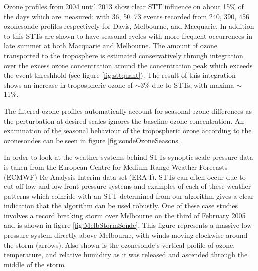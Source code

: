 Ozone profiles from 2004 until 2013 show clear STT influence on about 15\% of the days which are measured: with 36, 50, 73 events recorded from 240, 390, 456 ozonesonde profiles respectively for Davis, Melbourne, and Macquarie.
In addition to this STTs are shown to have seasonal cycles with more frequent occurrences in late summer at both Macquarie and Melbourne.
The amount of ozone transported to the troposphere is estimated conservatively through integration over the excess ozone concentration around the concentration peak which exceeds the event threshhold (see figure \ref{fig:sttquant}).
The result of this integration shows an increase in tropospheric ozone of $\sim$3\% due to STTs, with maxima $\sim$11\%.
 
The filtered ozone profiles automatically account for seasonal ozone differences as the perturbation at desired scales ignores the baseline ozone concentration.
An examination of the seasonal behaviour of the tropospheric ozone according to the ozonesondes can be seen in figure \ref{fig:sondeOzoneSeasons}.

In order to look at the weather systems behind STTs synoptic scale pressure data is taken from the European Centre for Medium-Range Weather Forecasts (ECMWF) Re-Analysis Interim data set (ERA-I).
STTs can often occur due to cut-off low and low front pressure systems and examples of each of these weather patterns which coincide with an STT determined from our algorithm gives a clear indication that the algorithm can be used robustly.
One of these case studies involves a record breaking storm over Melbourne on the third of February 2005 and is shown in figure \ref{fig:MelbStormSonde}.
This figure represents a massive low pressure system directly above Melbourne, with winds moving clockwise around the storm (arrows).
Also shown is the ozonesonde's vertical profile of ozone, temperature, and relative humidity as it was released and ascended through the middle of the storm.
